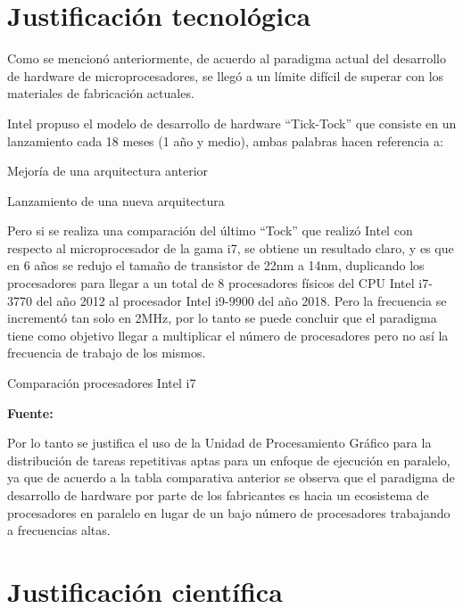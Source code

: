 \documentclass[../main/main.tex]{subfiles}
\begin{document}
  \section{Justificación tecnológica}

  Como se mencionó anteriormente, de acuerdo al paradigma actual del desarrollo de hardware de microprocesadores, se llegó a un límite difícil de superar con los materiales de fabricación actuales.

  Intel propuso el modelo de desarrollo de hardware ``Tick-Tock'' que consiste en un lanzamiento cada 18 meses (1 año y medio), ambas palabras hacen referencia a:

  \begin{description}
    \item[Tick:] Mejoría de una arquitectura anterior
    \item[Tock:] Lanzamiento de una nueva arquitectura
  \end{description}

  Pero si se realiza una comparación del último ``Tock'' que realizó Intel con respecto al microprocesador de la gama i7, se obtiene un resultado claro, y es que en 6 años se redujo el tamaño de transistor de 22nm a 14nm, duplicando los procesadores para llegar a un total de 8 procesadores físicos del CPU Intel i7-3770 del año 2012 al procesador Intel i9-9900 del año 2018. Pero la frecuencia se incrementó tan solo en 2MHz, por lo tanto se puede concluir que el paradigma tiene como objetivo llegar a multiplicar el número de procesadores pero no así la frecuencia de trabajo de los mismos.

  \begin{table}[H]
    \centering
    \caption{Comparación procesadores Intel i7}
    
    \caption*{\textbf{Fuente:} \href{https://cpu.userbenchmark.com/Compare/Intel-Core-i9-9900K-vs-Intel-Core-i7-3770/4028vs1979}{\cite{web:i9_vs_i7}}}
  \end{table}

  Por lo tanto se justifica el uso de la Unidad de Procesamiento Gráfico para la distribución de tareas repetitivas aptas para un enfoque de ejecución en paralelo, ya que de acuerdo a la tabla comparativa anterior se observa que el paradigma de desarrollo de hardware por parte de los fabricantes es hacia un ecosistema de procesadores en paralelo en lugar de un bajo número de procesadores trabajando a frecuencias altas.

  \section{Justificación científica}
\end{document}
